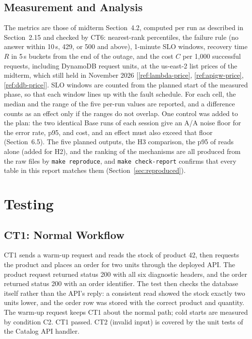 \documentclass[10pt]{article}
\begin{document}
\subsection{Measurement and Analysis}
The metrics are those of midterm Section~4.2, computed per run as described in
Section~2.15 and checked by CT6: nearest-rank percentiles, the failure rule
(no answer within 10\,s, 429, or 500 and above), 1-minute SLO windows,
recovery time $R$ in 5\,s buckets from the end of the outage, and the cost $C$
per 1{,}000 successful requests, including DynamoDB request units, at the
us-east-2 list prices of the midterm, which still held in November 2026
[\ref{ref:lambda-price}, \ref{ref:apigw-price}, \ref{ref:ddb-price}]. SLO windows
are counted from the planned start of the measured phase, so that each window
lines up with the fault schedule. For each cell, the median and the range of
the five per-run values are reported, and a difference counts as an effect only
if the ranges do not overlap. One control was added to the plan: the two
identical Base runs of each session give an A/A noise floor for the error
rate, p95, and cost, and an effect must also exceed that floor
(Section~6.5). The five planned outputs, the H3 comparison, the p95 of reads
alone (added for H2), and the ranking of the mechanisms are all produced from
the raw files by \texttt{make reproduce}, and \texttt{make check-report}
confirms that every table in this report matches them
(Section~\ref{sec:reproduced}).

\section{Testing}\label{sec:testing}

\subsection{CT1: Normal Workflow}
CT1 sends a warm-up request and reads the stock of product 42, then requests the
product and places an order for two units through the deployed API. The product
request returned status 200 with all six diagnostic headers, and the order
returned status 200 with an order identifier. The test then checks the database
itself rather than the API's reply: a consistent read showed the stock exactly
two units lower, and the order row was stored with the correct product and
quantity. The warm-up request keeps CT1 about the normal path; cold starts are
measured by condition C2. CT1 passed. CT2 (invalid input) is covered by the unit
tests of the Catalog API handler.
\end{document}
